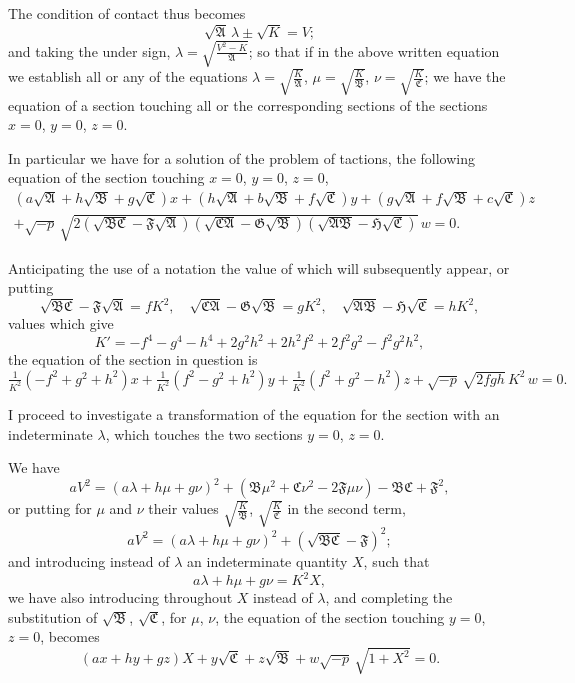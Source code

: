 \documentclass[11pt,a4paper]{book}
\begin{document}
The condition of contact thus becomes
\[
\sqrt{\mathfrak{A}}\,\lambda \pm \sqrt{K} = V;
\]
and taking the under sign, $\lambda = \sqrt{\tfrac{V^2-K}{\mathfrak{A}}}$; so that if in the above written equation we establish all or any of the equations $\lambda=\sqrt{\tfrac{K}{\mathfrak{A}}}$, $\mu=\sqrt{\tfrac{K}{\mathfrak{B}}}$, $\nu=\sqrt{\tfrac{K}{\mathfrak{C}}}$; we have the equation of a section touching all or the corresponding sections of the sections $x=0$, $y=0$, $z=0$.

In particular we have for a solution of the problem of tactions, the following equation of the section touching $x=0$, $y=0$, $z=0$,
\begin{multline*}
(a\sqrt{\mathfrak{A}}+h\sqrt{\mathfrak{B}}+g\sqrt{\mathfrak{C}})x + (h\sqrt{\mathfrak{A}}+b\sqrt{\mathfrak{B}}+f\sqrt{\mathfrak{C}})y + (g\sqrt{\mathfrak{A}}+f\sqrt{\mathfrak{B}}+c\sqrt{\mathfrak{C}})z \\
+ \sqrt{-p}\,\sqrt{2(\sqrt{\mathfrak{B}\mathfrak{C}}-\mathfrak{F}\sqrt{\mathfrak{A}})(\sqrt{\mathfrak{C}\mathfrak{A}}-\mathfrak{G}\sqrt{\mathfrak{B}})(\sqrt{\mathfrak{A}\mathfrak{B}}-\mathfrak{H}\sqrt{\mathfrak{C}})}\,w = 0.
\end{multline*}

\newpage
\setcounter{page}{65}

Anticipating the use of a notation the value of which will subsequently appear, or putting
\[
\sqrt{\mathfrak{B}\mathfrak{C}}-\mathfrak{F}\sqrt{\mathfrak{A}} = fK^2, \quad \sqrt{\mathfrak{C}\mathfrak{A}}-\mathfrak{G}\sqrt{\mathfrak{B}} = gK^2, \quad \sqrt{\mathfrak{A}\mathfrak{B}}-\mathfrak{H}\sqrt{\mathfrak{C}} = hK^2,
\]
values which give
\[
K' = -f^4-g^4-h^4+2g^2h^2+2h^2f^2+2f^2g^2-f^2g^2h^2,
\]
the equation of the section in question is
\[
\tfrac{1}{K^2}(-f^2+g^2+h^2)x + \tfrac{1}{K^2}(f^2-g^2+h^2)y + \tfrac{1}{K^2}(f^2+g^2-h^2)z + \sqrt{-p}\,\sqrt{2fgh}\,K^2\,w = 0.
\]

I proceed to investigate a transformation of the equation for the section with an indeterminate $\lambda$, which touches the two sections $y=0$, $z=0$.

We have
\[
aV^2 = (a\lambda+h\mu+g\nu)^2 + (\mathfrak{B}\mu^2+\mathfrak{C}\nu^2-2\mathfrak{F}\mu\nu) - \mathfrak{B}\mathfrak{C} + \mathfrak{F}^2,
\]
or putting for $\mu$ and $\nu$ their values $\sqrt{\tfrac{K}{\mathfrak{B}}}$, $\sqrt{\tfrac{K}{\mathfrak{C}}}$ in the second term,
\[
aV^2 = (a\lambda+h\mu+g\nu)^2 + (\sqrt{\mathfrak{B}\mathfrak{C}}-\mathfrak{F})^2;
\]
and introducing instead of $\lambda$ an indeterminate quantity $X$, such that
\[
a\lambda+h\mu+g\nu = K^2 X,
\]
we have also introducing throughout $X$ instead of $\lambda$, and completing the substitution of $\sqrt{\mathfrak{B}}$, $\sqrt{\mathfrak{C}}$, for $\mu$, $\nu$, the equation of the section touching $y=0$, $z=0$, becomes
\[
(ax+hy+gz)X + y\sqrt{\mathfrak{C}} + z\sqrt{\mathfrak{B}} + w\sqrt{-p}\,\sqrt{1+X^2} = 0.
\]
\end{document}
